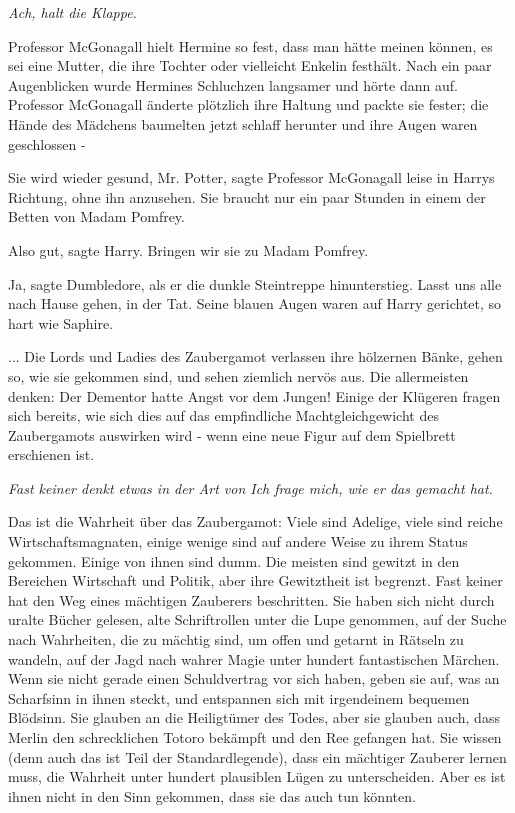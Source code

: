 \emph{Ach, halt die Klappe.}

Professor McGonagall hielt Hermine so fest, dass man hätte meinen können, es sei
eine Mutter, die ihre Tochter oder vielleicht Enkelin festhält. Nach ein paar
Augenblicken wurde Hermines Schluchzen langsamer und hörte dann auf. Professor
McGonagall änderte plötzlich ihre Haltung und packte sie fester; die Hände des
Mädchens baumelten jetzt schlaff herunter und ihre Augen waren geschlossen -

\glqq Sie wird wieder gesund, Mr. Potter\grqq{}, sagte Professor McGonagall
leise in Harrys Richtung, ohne ihn anzusehen. \glqq Sie braucht nur ein paar
Stunden in einem der Betten von Madam Pomfrey.\grqq{}

\glqq Also gut\grqq{}, sagte Harry. \glqq Bringen wir sie zu Madam
Pomfrey.\grqq{}

\glqq Ja\grqq{}, sagte Dumbledore, als er die dunkle Steintreppe hinunterstieg.
\glqq Lasst uns alle nach Hause gehen, in der Tat.\grqq{} Seine blauen Augen
waren auf Harry gerichtet, so hart wie Saphire.

... Die Lords und Ladies des Zaubergamot verlassen ihre hölzernen Bänke, gehen
so, wie sie gekommen sind, und sehen ziemlich nervös aus. Die allermeisten
denken: \glqq Der Dementor hatte Angst vor dem Jungen!\grqq{} Einige der
Klügeren fragen sich bereits, wie sich dies auf das empfindliche
Machtgleichgewicht des Zaubergamots auswirken wird - wenn eine neue Figur auf
dem Spielbrett erschienen ist.

\emph{Fast keiner denkt etwas in der Art von \glqq Ich frage mich, wie er das
gemacht hat.\grqq{} }

Das ist die Wahrheit über das Zaubergamot: Viele sind Adelige, viele sind reiche
Wirtschaftsmagnaten, einige wenige sind auf andere Weise zu ihrem Status
gekommen. Einige von ihnen sind dumm. Die meisten sind gewitzt in den Bereichen
Wirtschaft und Politik, aber ihre Gewitztheit ist begrenzt. Fast keiner hat den
Weg eines mächtigen Zauberers beschritten. Sie haben sich nicht durch uralte
Bücher gelesen, alte Schriftrollen unter die Lupe genommen, auf der Suche nach
Wahrheiten, die zu mächtig sind, um offen und getarnt in Rätseln zu wandeln, auf
der Jagd nach wahrer Magie unter hundert fantastischen Märchen. Wenn sie nicht
gerade einen Schuldvertrag vor sich haben, geben sie auf, was an Scharfsinn in
ihnen steckt, und entspannen sich mit irgendeinem bequemen Blödsinn. Sie glauben
an die Heiligtümer des Todes, aber sie glauben auch, dass Merlin den
schrecklichen Totoro bekämpft und den Ree gefangen hat. Sie wissen (denn auch
das ist Teil der Standardlegende), dass ein mächtiger Zauberer lernen muss, die
Wahrheit unter hundert plausiblen Lügen zu unterscheiden. Aber es ist ihnen
nicht in den Sinn gekommen, dass sie das auch tun könnten.

